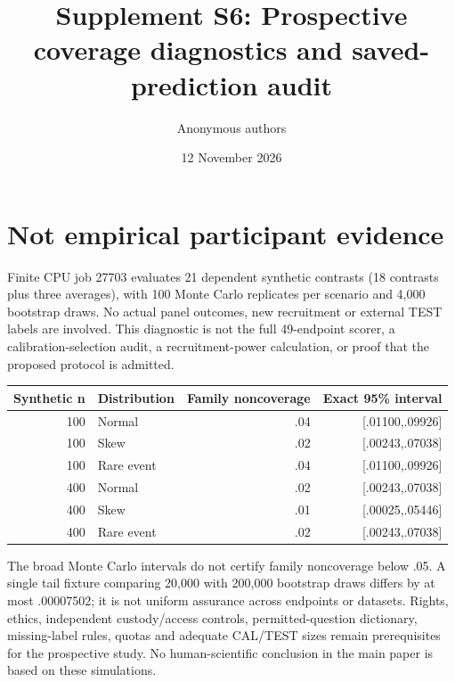 \documentclass[10pt]{article}
\title{Supplement S6: Prospective coverage diagnostics and saved-prediction audit}\author{Anonymous authors}\date{12 November 2026}
\begin{document}
\maketitle
\section{Not empirical participant evidence}
Finite CPU job 27703 evaluates 21 dependent synthetic contrasts (18 contrasts plus three averages), with 100 Monte Carlo replicates per scenario and 4,000 bootstrap draws. No actual panel outcomes, new recruitment or external TEST labels are involved. This diagnostic is not the full 49-endpoint scorer, a calibration-selection audit, a recruitment-power calculation, or proof that the proposed protocol is admitted.
\begin{center}\begin{tabular}{rlrr}\toprule
Synthetic n & Distribution & Family noncoverage & Exact 95\% interval\\\midrule
100 & Normal & .04 & [.01100,.09926]\\
100 & Skew & .02 & [.00243,.07038]\\
100 & Rare event & .04 & [.01100,.09926]\\
400 & Normal & .02 & [.00243,.07038]\\
400 & Skew & .01 & [.00025,.05446]\\
400 & Rare event & .02 & [.00243,.07038]\\\bottomrule
\end{tabular}\end{center}
The broad Monte Carlo intervals do not certify family noncoverage below .05. A single tail fixture comparing 20,000 with 200,000 bootstrap draws differs by at most .00007502; it is not uniform assurance across endpoints or datasets. Rights, ethics, independent custody/access controls, permitted-question dictionary, missing-label rules, quotas and adequate CAL/TEST sizes remain prerequisites for the prospective study. No human-scientific conclusion in the main paper is based on these simulations.
\end{document}
